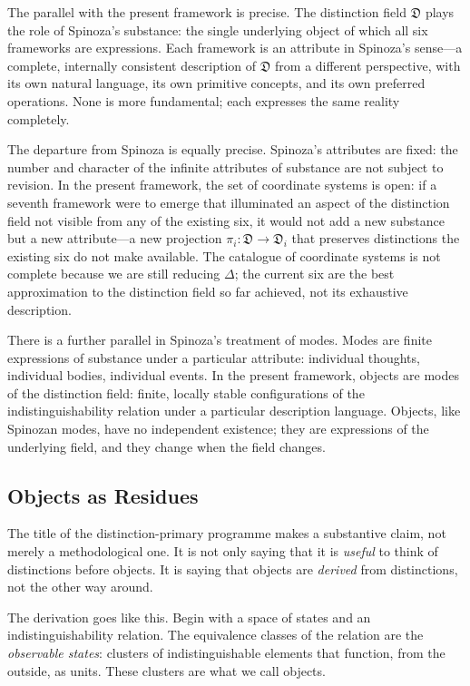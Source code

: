 \documentclass[12pt, letterpaper]{article}
\theoremstyle{remark}
\begin{document}
The parallel with the present framework is precise.  The distinction field
$\mathfrak{D}$ plays the role of Spinoza's substance: the single underlying
object of which all six frameworks are expressions.  Each framework is an
attribute in Spinoza's sense---a complete, internally consistent description
of $\mathfrak{D}$ from a different perspective, with its own natural language,
its own primitive concepts, and its own preferred operations.  None is more
fundamental; each expresses the same reality completely.

The departure from Spinoza is equally precise.  Spinoza's attributes are
fixed: the number and character of the infinite attributes of substance are
not subject to revision.  In the present framework, the set of coordinate
systems is open: if a seventh framework were to emerge that illuminated an
aspect of the distinction field not visible from any of the existing six, it
would not add a new substance but a new attribute---a new projection
$\pi_i: \mathfrak{D} \to \mathfrak{D}_i$ that preserves distinctions the
existing six do not make available.  The catalogue of coordinate systems
is not complete because we are still reducing $\Delta$; the current six are
the best approximation to the distinction field so far achieved, not its
exhaustive description.

There is a further parallel in Spinoza's treatment of modes.  Modes are
finite expressions of substance under a particular attribute: individual
thoughts, individual bodies, individual events.  In the present framework,
objects are modes of the distinction field: finite, locally stable
configurations of the indistinguishability relation under a particular
description language.  Objects, like Spinozan modes, have no independent
existence; they are expressions of the underlying field, and they change
when the field changes.

\subsection{Objects as Residues}

The title of the distinction-primary programme makes a substantive claim,
not merely a methodological one.  It is not only saying that it is
\emph{useful} to think of distinctions before objects.  It is saying that
objects are \emph{derived} from distinctions, not the other way around.

The derivation goes like this.  Begin with a space of states and an
indistinguishability relation.  The equivalence classes of the relation
are the \emph{observable states}: clusters of indistinguishable elements
that function, from the outside, as units.  These clusters are what we
call objects.
\end{document}

